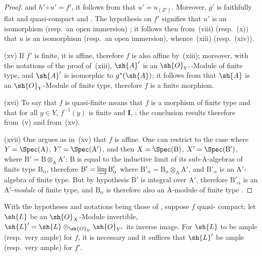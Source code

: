 \begin{proof}
and $h'\circ u'=f'$, it follows from  that $u'=u_{(Z')}$. Moreover, $g'$
is faithfully flat and quasi-compact  and . The hypothesis on $f'$ signifies that $u'$ is
an isomorphism (resp.\ an open immersion) ; it follows then from~(viii)
(resp.\ (x)) that $u$ is an isomorphism (resp.\ an open immersion), whence~(xiii)
(resp.\ (xiv)).


(xv) If $f'$ is finite, it is affine, therefore $f$ is also affine by~(xiii); moreover, with the notations
of the proof of~(xiii), $\sh{A}'$ is an $\sh{O}_{Y'}$-Module of finite type, and $\sh{A}'$ is isomorphic
to $g^*(\sh{A})$; it follows from  that $\sh{A}$ is an $\sh{O}_Y$-Module of finite type, therefore $f$ is a finite
morphism.

(xvi) To say that $f$ is quasi-finite means that $f$ is a morphism of finite type and that
for all $y\in Y$, $f^{-1}(y)$ is finite  and \textbf{I}, ; the conclusion results therefore from~(v)
and from~(xv).

(xvii) One argues as in~(xv) that $f$ is affine. One can restrict to the case
where $Y=\Spec(\mathrm{A})$, $Y'=\Spec(\mathrm{A}')$, and then $X=\Spec(\mathrm{B})$, $X'=\Spec(\mathrm{B}')$, where $\mathrm{B}'=\mathrm{B}\otimes_{\mathrm{A}}\mathrm{A}'$;
$\mathrm{B}$ is equal to the inductive limit of its sub-$\mathrm{A}$-algebras of finite type $\mathrm{B}_\alpha$, therefore
$\mathrm{B}'=\varinjlim\mathrm{B}'_\alpha$ where $\mathrm{B}'_\alpha=\mathrm{B}_\alpha\otimes_{\mathrm{A}}\mathrm{A}'$, and $\mathrm{B}'_\alpha$ is an $\mathrm{A}'$-algebra of finite type. But by
hypothesis $\mathrm{B}'$ is integral over $\mathrm{A}'$, therefore $\mathrm{B}'_\alpha$ is an $\mathrm{A}'$-\emph{module} of finite type, and $\mathrm{B}_\alpha$ is therefore also an
$\mathrm{A}$-module of finite type .
\end{proof}

\begin{corollary}[2.7.2]
\label{IV.2.7.2}
With the hypotheses and notations being those of , suppose $f$ quasi-
compact; let $\sh{L}$ be an $\sh{O}_X$-Module invertible, $\sh{L}'=\sh{L}\otimes_{\sh{O}_Y}\sh{O}_{Y'}$ its inverse image. For $\sh{L}$
to be ample \textnormal{(}resp.\ very ample\textnormal{)} for $f$, it is necessary and it suffices that $\sh{L}'$ be ample \textnormal{(}resp.\ very ample\textnormal{)} for $f'$.
\end{corollary}

